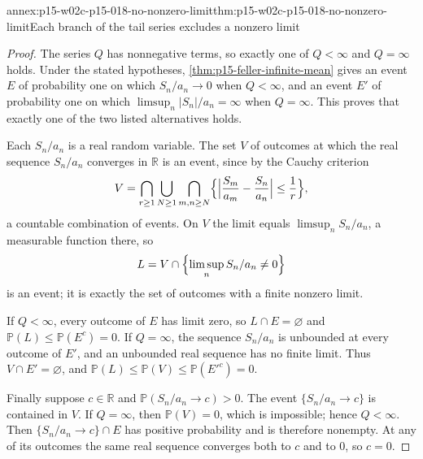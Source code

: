 \begin{annexitem}{annex:p15-w02c-p15-018-no-nonzero-limit}{thm:p15-w02c-p15-018-no-nonzero-limit}{Each branch of the tail series excludes a nonzero limit}
\begin{proof}
The series \(Q\) has nonnegative terms, so exactly one of
\(Q<\infty\) and \(Q=\infty\) holds. Under the stated hypotheses,
\cref{thm:p15-feller-infinite-mean} gives an event \(E\) of probability
one on which \(S_n/a_n\to0\) when \(Q<\infty\), and an event \(E'\) of
probability one on which \(\limsup_n|S_n|/a_n=\infty\) when
\(Q=\infty\). This proves that exactly one of the two listed
alternatives holds.

Each \(S_n/a_n\) is a real random variable. The set \(V\) of outcomes
at which the real sequence \(S_n/a_n\) converges in \(\mathbb R\) is
an event, since by the Cauchy criterion
\[
 V=\bigcap_{r\geq1}\bigcup_{N\geq1}\bigcap_{m,n\geq N}
     \Bigl\{\Bigl|\frac{S_m}{a_m}-\frac{S_n}{a_n}\Bigr|\leq\frac1r\Bigr\},
\]
a countable combination of events. On \(V\) the limit equals
\(\limsup_nS_n/a_n\), a measurable function there, so
\[
 L=V\cap\Bigl\{\limsup_nS_n/a_n\neq0\Bigr\}
\]
is an event; it is exactly the set of outcomes with a finite nonzero
limit.

If \(Q<\infty\), every outcome of \(E\) has limit zero, so
\(L\cap E=\varnothing\) and \(\mathbb P(L)\leq\mathbb P(E^c)=0\).
If \(Q=\infty\), the sequence \(S_n/a_n\) is unbounded at every outcome
of \(E'\), and an unbounded real sequence has no finite limit. Thus
\(V\cap E'=\varnothing\), and
\(\mathbb P(L)\leq\mathbb P(V)\leq\mathbb P(E'^c)=0\).

Finally suppose \(c\in\mathbb R\) and
\(\mathbb P(S_n/a_n\to c)>0\). The event \(\{S_n/a_n\to c\}\) is
contained in \(V\). If \(Q=\infty\), then \(\mathbb P(V)=0\), which is
impossible; hence \(Q<\infty\). Then
\(\{S_n/a_n\to c\}\cap E\) has positive probability and is therefore
nonempty. At any of its outcomes the same real sequence converges both
to \(c\) and to \(0\), so \(c=0\).
\end{proof}
\end{annexitem}

